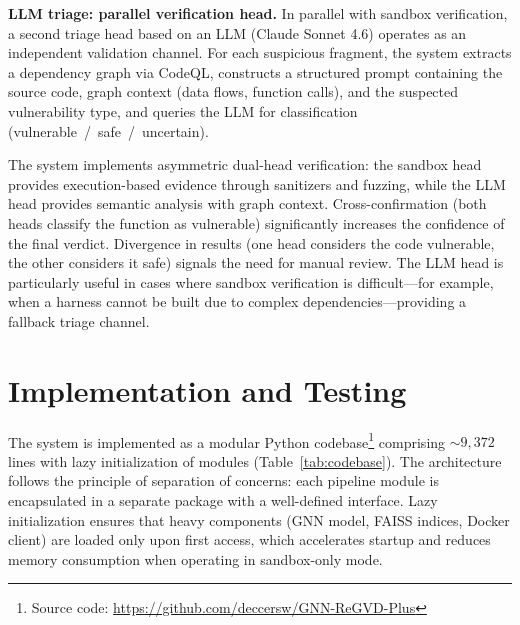 \documentclass[runningheads]{llncs}
\begin{document}
\textbf{LLM triage: parallel verification head.}
In parallel with sandbox verification, a second triage head based on an LLM (Claude Sonnet 4.6) operates as an independent validation channel. For each suspicious fragment, the system extracts a dependency graph via CodeQL, constructs a structured prompt containing the source code, graph context (data flows, function calls), and the suspected vulnerability type, and queries the LLM for classification (vulnerable~/~safe~/~uncertain).

The system implements asymmetric dual-head verification: the sandbox head provides execution-based evidence through sanitizers and fuzzing, while the LLM head provides semantic analysis with graph context. Cross-confirmation (both heads classify the function as vulnerable) significantly increases the confidence of the final verdict. Divergence in results (one head considers the code vulnerable, the other considers it safe) signals the need for manual review. The LLM head is particularly useful in cases where sandbox verification is difficult---for example, when a harness cannot be built due to complex dependencies---providing a fallback triage channel.


\section{Implementation and Testing}

The system is implemented as a modular Python codebase\footnote{Source code: \url{https://github.com/deccersw/GNN-ReGVD-Plus}} comprising ${\sim}9,372$ lines with lazy initialization of modules (Table~\ref{tab:codebase}). The architecture follows the principle of separation of concerns: each pipeline module is encapsulated in a separate package with a well-defined interface. Lazy initialization ensures that heavy components (GNN model, FAISS indices, Docker client) are loaded only upon first access, which accelerates startup and reduces memory consumption when operating in sandbox-only mode.
\end{document}
